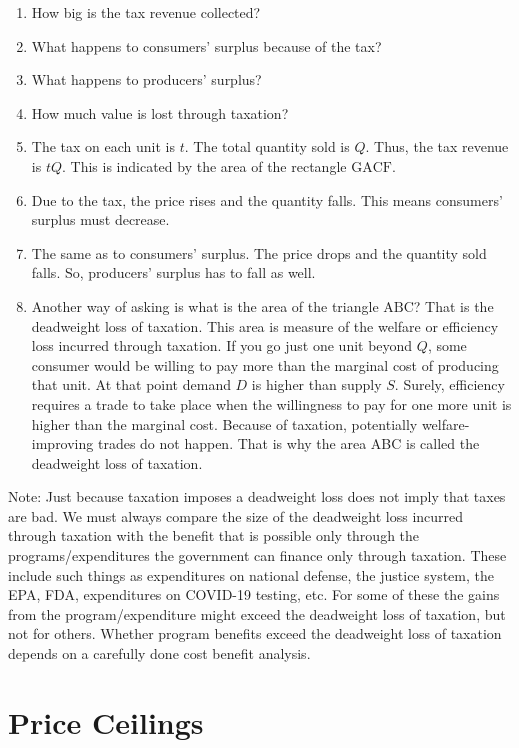 \documentclass[
]{book}
\begin{document}
\begin{enumerate}
\def\labelenumi{\arabic{enumi}.}
\item
  How big is the tax revenue collected?
\item
  What happens to consumers' surplus because of the tax?
\item
  What happens to producers' surplus?
\item
  How much value is lost through taxation?
\item
  The tax on each unit is \(t\). The total quantity sold is \(Q\). Thus, the tax revenue is \(tQ\). This is indicated by the area of the rectangle \(\text{GACF}\).
\item
  Due to the tax, the price rises and the quantity falls. This means consumers' surplus must decrease.
\item
  The same as to consumers' surplus. The price drops and the quantity sold falls. So, producers' surplus has to fall as well.
\item
  Another way of asking is what is the area of the triangle \(\text{ABC}\)? That is the deadweight loss of taxation. This area is measure of the welfare or efficiency loss incurred through taxation. If you go just one unit beyond \(Q\), some consumer would be willing to pay more than the marginal cost of producing that unit. At that point demand \(D\) is higher than supply \(S\). Surely, efficiency requires a trade to take place when the willingness to pay for one more unit is higher than the marginal cost. Because of taxation, potentially welfare-improving trades do not happen. That is why the area ABC is called the deadweight loss of taxation.
\end{enumerate}

Note: Just because taxation imposes a deadweight loss does not imply that taxes are bad. We must always compare the size of the deadweight loss incurred through taxation with the benefit that is possible only through the programs/expenditures the government can finance only through taxation. These include such things as expenditures on national defense, the justice system, the EPA, FDA, expenditures on COVID-19 testing, etc. For some of these the gains from the program/expenditure might exceed the deadweight loss of taxation, but not for others. Whether program benefits exceed the deadweight loss of taxation depends on a carefully done cost benefit analysis.

\hypertarget{price-ceilings}{%
\section{Price Ceilings}\label{price-ceilings}}
\end{document}
